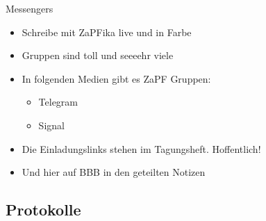 \documentclass[compress,]{beamer}
\begin{document}




\begin{frame}{Messengers}

\begin{itemize}[<+->]
	\item Schreibe mit ZaPFika live und in Farbe
	\item Gruppen sind toll und seeeehr viele
	\item In folgenden Medien gibt es ZaPF Gruppen:
		\begin{itemize}
			\item Telegram
			\item Signal
		\end{itemize}
	\item Die Einladungslinks stehen im Tagungsheft. Hoffentlich!
	\item Und hier auf BBB in den geteilten Notizen
\end{itemize}

\end{frame}


%
%



\subsection{Protokolle}
\end{document}
